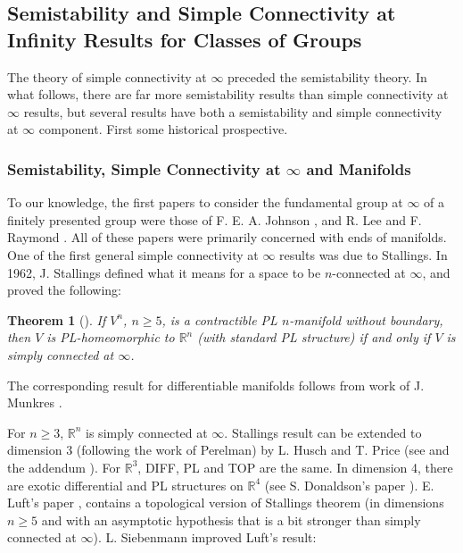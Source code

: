 \documentclass[12pt]{article}
\newtheorem{theorem}{Theorem}[subsection]
\begin{document}
\newpage
\subsection{Semistability and Simple Connectivity at Infinity Results for Classes of Groups}\label{Gresults}

The theory of simple connectivity at $\infty$ preceded the semistability theory. In what follows, there are far more semistability results than simple connectivity at $\infty$ results, but several results have both a semistability and simple connectivity at $\infty$ component. First some historical prospective.

\subsubsection{Semistability, Simple Connectivity at $\infty$ and Manifolds} \label{CC}
To our knowledge, the first papers to consider the fundamental group at $\infty$ of a finitely presented group were those of F. E. A. Johnson \cite{Joh74}, \cite{Joh75} and R. Lee and F. Raymond \cite{LR75}. All of these papers were primarily concerned with ends of manifolds. 
One of the first general simple connectivity at $\infty$ results was due to Stallings. 
In 1962, J. Stallings defined what it means for a space to be $n$-connected at $\infty$, and proved the following:

\begin{theorem}  [\cite{St62}] \label{StallSC}  If $V^n$, $n\geq 5$, is a contractible PL $n$-manifold without boundary, then $V$ is PL-homeomorphic to $\mathbb R^n$ (with standard PL structure) if and only if $V$ is simply connected at $\infty$. 
\end{theorem}

The corresponding result for differentiable manifolds follows from work of J. Munkres \cite{Mun60}.

For $n\geq 3$,  $\mathbb R^n$ is simply connected at $\infty$. 
Stallings result can be extended to dimension 3 (following the work of Perelman) by L. Husch and T. Price (see \cite{HP70} and the addendum \cite{HP71}). For $\mathbb R^3$, DIFF, PL and TOP are the same. In dimension 4, there are exotic differential and PL structures on $\mathbb R^4$ (see S. Donaldson's paper \cite{Don83}). E. Luft's paper \cite{Luf67}, contains a topological version of Stallings theorem (in dimensions $n\geq 5$ and with an asymptotic hypothesis that is a bit stronger than simply connected at $\infty$). L. Siebenmann  improved Luft's result: 
\end{document}
